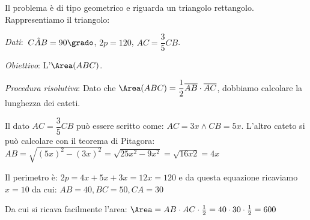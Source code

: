 \begin{soluzione}
 Il problema è di tipo geometrico e riguarda un triangolo rettangolo.
Rappresentiamo il triangolo:

\begin{multicols}{2}

\emph{Dati}:~\(C\hat{{A}}B=90\grado\), \(2p= 120\), \(AC=\dfrac{3}{5}CB\).

\emph{Obiettivo}: L'\(\Area (ABC)\).

\begin{center}
 
\end{center}
\end{multicols}

\emph{Procedura risolutiva}:
Dato che \(\Area (ABC) =\dfrac{1}{2}\overline{AB}\cdot \overline{AC}\),
dobbiamo calcolare la lunghezza dei cateti.

Il dato \(AC=\dfrac{3}{5}CB\) può essere scritto come: \(AC=3x \wedge CB=5x\).
L'altro cateto si può calcolare con il teorema di Pitagora:
\(AB=\sqrt{(5x)^2-(3x)^2}=\sqrt{25x^2-9x^2}=\sqrt{16x2}=4x\)

Il perimetro è: \(2p=4x+5x+3x=12x=120\) e da questa equazione ricaviamo 
\(x=10\) da cui: \(AB=40, BC=50, CA=30\)

Da cui si ricava facilmente l'area: 
\(\Area=AB \cdot AC \cdot \frac{1}{2} = 40 \cdot 30 \cdot \frac{1}{2} =600\)
\end{soluzione}
